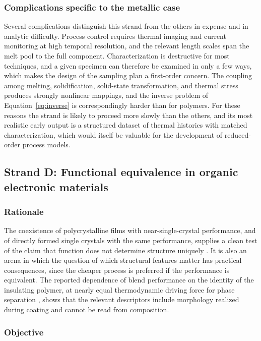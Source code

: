 \documentclass[11pt]{article}
\theoremstyle{definition}
\begin{document}
\subsubsection*{Complications specific to the metallic case}

Several complications distinguish this strand from the others in expense and in analytic difficulty. Process control requires thermal imaging and current monitoring at high temporal resolution, and the relevant length scales span the melt pool to the full component. Characterization is destructive for most techniques, and a given specimen can therefore be examined in only a few ways, which makes the design of the sampling plan a first-order concern. The coupling among melting, solidification, solid-state transformation, and thermal stress produces strongly nonlinear mappings, and the inverse problem of Equation~\eqref{eq:inverse} is correspondingly harder than for polymers. For these reasons the strand is likely to proceed more slowly than the others, and its most realistic early output is a structured dataset of thermal histories with matched characterization, which would itself be valuable for the development of reduced-order process models.

\subsection{Strand D: Functional equivalence in organic electronic materials}

\subsubsection*{Rationale}

The coexistence of polycrystalline films with near-single-crystal performance, and of directly formed single crystals with the same performance, supplies a clean test of the claim that function does not determine structure uniquely \cite{niazi2015,rigas2016}. It is also an arena in which the question of which structural features matter has practical consequences, since the cheaper process is preferred if the performance is equivalent. The reported dependence of blend performance on the identity of the insulating polymer, at nearly equal thermodynamic driving force for phase separation \cite{niazi2015}, shows that the relevant descriptors include morphology realized during coating and cannot be read from composition.

\subsubsection*{Objective}
\end{document}
